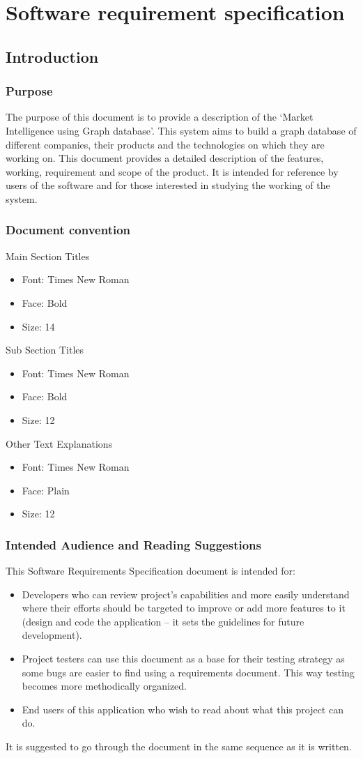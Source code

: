 \section{Software requirement specification}
\subsection{Introduction}
\subsubsection{Purpose}
\par The purpose of this document is to provide a description of the ‘Market Intelligence using Graph database’. This system aims to build a graph database of different companies,  their products and the technologies on which they are working on. This document provides a detailed description of the features, working, requirement and scope of the product. It is intended for reference by users of the software and for those interested in studying the working of the system.
\subsubsection{Document convention}
Main Section Titles
\begin{itemize}
	\item Font: Times New Roman
	\item Face: Bold
	\item Size: 14
\end{itemize}
Sub Section Titles
\begin{itemize}
	\item Font: Times New Roman
	\item Face: Bold
	\item Size: 12
\end{itemize}
Other Text Explanations
\begin{itemize}
	\item Font: Times New Roman
	\item Face: Plain
	\item Size: 12
\end{itemize}
\subsubsection{Intended Audience and Reading Suggestions}
This Software Requirements Specification document is intended for:
\begin{itemize}
\item Developers who can review project’s capabilities and more easily understand where their efforts should be targeted to improve or add more features to it (design and code the application – it sets the guidelines for future development).
\item Project testers can use this document as a base for their testing strategy as some bugs are easier to find using a requirements document. This way testing becomes more methodically organized.
\item End users of this application who wish to read about what this project can do.
\end{itemize}
It is suggested to go through the document in the same sequence as it is written.
